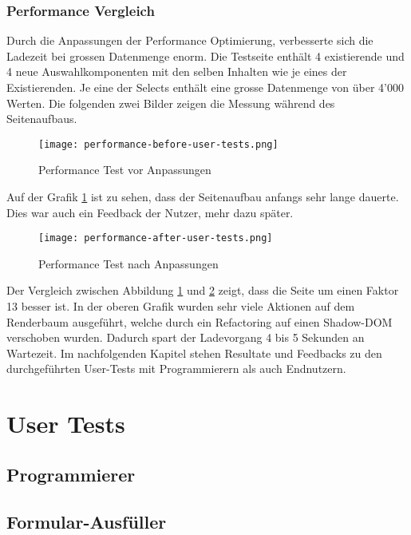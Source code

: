 \subsubsection{Performance Vergleich}

Durch die Anpassungen der Performance Optimierung, verbesserte sich die Ladezeit bei grossen Datenmenge enorm.
Die Testseite enthält 4 existierende und 4 neue Auswahlkomponenten mit den selben Inhalten wie je eines der Existierenden.
Je eine der Selects enthält eine grosse Datenmenge von über 4'000 Werten.
Die folgenden zwei Bilder zeigen die Messung während des Seitenaufbaus.

\begin{figure}[!htb]
    \centering
    \texttt{[image: performance-before-user-tests.png]}
    \caption{Performance Test vor Anpassungen}
    \label{Abbildung:PerformanceTestBefore}
\end{figure}

Auf der Grafik \ref{Abbildung:PerformanceTestBefore} ist zu sehen, dass der Seitenaufbau anfangs sehr lange dauerte.
Dies war auch ein Feedback der Nutzer, mehr dazu später.

\begin{figure}[!htb]
    \centering
    \texttt{[image: performance-after-user-tests.png]}
    \caption{Performance Test nach Anpassungen}
    \label{Abbildung:PerformanceTestAfter}
\end{figure}

Der Vergleich zwischen Abbildung \ref{Abbildung:PerformanceTestBefore} und \ref{Abbildung:PerformanceTestAfter} zeigt, dass die Seite um einen Faktor 13 besser ist.
In der oberen Grafik wurden sehr viele Aktionen auf dem Renderbaum ausgeführt, welche durch ein Refactoring auf einen Shadow-DOM verschoben wurden.
Dadurch spart der Ladevorgang 4 bis 5 Sekunden an Wartezeit.
Im nachfolgenden Kapitel stehen Resultate und Feedbacks zu den durchgeführten User-Tests mit Programmierern als auch Endnutzern.


\section{User Tests}


\subsection{Programmierer}



\subsection{Formular-Ausfüller}



